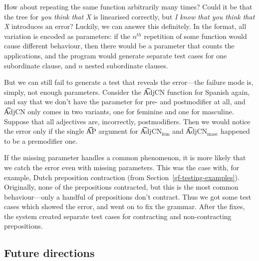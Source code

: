 How about repeating the same function arbitrarily many times? Could it
be that the tree for {\em you think that X} is linearised correctly,
but {\em I know that you think that X} introduces an error?  Luckily,
we can answer this definitely.  In the \pmcfg{} format, all variation
is encoded as parameters: if the $n^{th}$ repetition of some function
would cause different behaviour, then there would be a parameter that
counts the applications, and the program would generate separate test
cases for one subordinate clause, and $n$ nested subordinate clauses.

But we can still fail to generate a test that reveals the error---the
failure mode is, simply, not enough parameters.  Consider the
\t{AdjCN} function for Spanish again, and say that we don’t have the
parameter for pre- and postmodifier at all, and \t{AdjCN} only comes
in two variants, one for feminine and one for masculine. Suppose that
all adjectives are, incorrectly, postmodifiers. Then we would notice
the error only if the single \t{AP} argument for \t{AdjCN$_{\text{fem}}$}
and \t{AdjCN$_{\text{masc}}$} happened to be a premodifier one.

If the missing parameter handles a common phenomenon, it is more
likely that we catch the error even with missing parameters. This was
the case with, for example, Dutch preposition contraction (from
Section~\ref{gf-testing-examples}). Originally, none of the
prepositions contracted, but this is the most common behaviour---only a
handful of prepositions don’t contract. Thus we got some test cases
which showed the error, and went on to fix the grammar. After the
fixes, the system created separate test cases for contracting and
non-contracting prepositions.

\subsection{Future directions}

